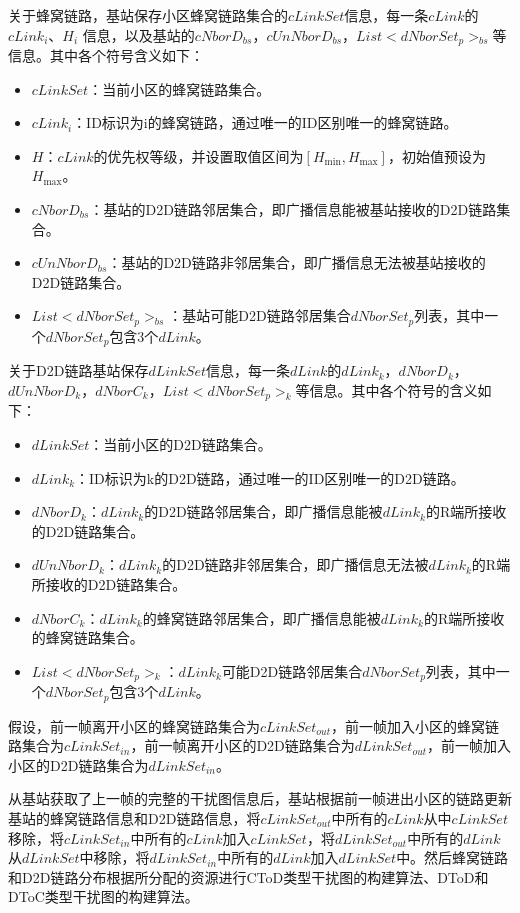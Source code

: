 \documentclass[figurelist,tablelist,algorithmlist,nomlist,masters]{seuthesix}
\begin{document}
	关于蜂窝链路，基站保存小区蜂窝链路集合的$cLinkSet$信息，每一条$cLink$的$cLink_i$、${H_i}$ 信息，以及基站的$cNborD_{bs}$，$cUnNborD_{bs}$，$List < dNborSet_{p}{ > _{bs}}$等信息。其中各个符号含义如下：
	
	\begin{itemize}
		\item $cLinkSet$：当前小区的蜂窝链路集合。
		\item $cLink_i$：ID标识为i的蜂窝链路，通过唯一的ID区别唯一的蜂窝链路。
		\item ${H}$：$cLink$的优先权等级，并设置取值区间为$\left[ {{H_{\min }},{H_{\max }}} \right]$，初始值预设为${H_{\max }}$。
		\item $cNborD_{bs}$：基站的D2D链路邻居集合，即广播信息能被基站接收的D2D链路集合。
		\item $cUnNborD_{bs}$：基站的D2D链路非邻居集合，即广播信息无法被基站接收的D2D链路集合。
		\item $List < dNborSet_{p}{ > _{bs}}$：基站可能D2D链路邻居集合$dNborSet_{p}$列表，其中一个$dNborSet_{p}$包含3个$dLink$。
	\end{itemize}
	
	关于D2D链路基站保存$dLinkSet$信息，每一条$dLink$的$dLink_k$，$dNborD_k$，$dUnNborD_k$，$dNborC_k$，$List < dNborSet_{p}{ > _k}$等信息。其中各个符号的含义如下：
	
	\begin{itemize}
		\item $dLinkSet$：当前小区的D2D链路集合。
		\item $dLink_k$：ID标识为k的D2D链路，通过唯一的ID区别唯一的D2D链路。
		\item $dNborD_k$：$dLink_k$的D2D链路邻居集合，即广播信息能被$dLink_k$的R端所接收的D2D链路集合。
		\item $dUnNborD_k$：$dLink_k$的D2D链路非邻居集合，即广播信息无法被$dLink_k$的R端所接收的D2D链路集合。
		\item $dNborC_k$：$dLink_k$的蜂窝链路邻居集合，即广播信息能被$dLink_k$的R端所接收的蜂窝链路集合。
		\item $List < dNborSet_{p}{ > _k}$：$dLink_k$可能D2D链路邻居集合$dNborSet_{p}$列表，其中一个$dNborSet_{p}$包含3个$dLink$。
	\end{itemize}
	
	假设，前一帧离开小区的蜂窝链路集合为$cLinkSet_{out}$，前一帧加入小区的蜂窝链路集合为$cLinkSet_{in}$，前一帧离开小区的D2D链路集合为$dLinkSet_{out}$，前一帧加入小区的D2D链路集合为$dLinkSet_{in}$。
	
	从基站获取了上一帧的完整的干扰图信息后，基站根据前一帧进出小区的链路更新基站的蜂窝链路信息和D2D链路信息，将$cLinkSet_{out}$中所有的$cLink$从中$cLinkSet$移除，将$cLinkSet_{in}$中所有的$cLink$加入$cLinkSet$，将$dLinkSet_{out}$中所有的$dLink$从$dLinkSet$中移除，将$dLinkSet_{in}$中所有的$dLink$加入$dLinkSet$中。然后蜂窝链路和D2D链路分布根据所分配的资源进行CToD类型干扰图的构建算法、DToD和DToC类型干扰图的构建算法。
	
\end{document}
